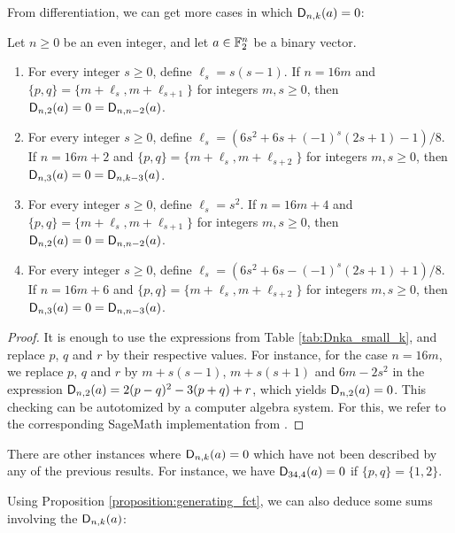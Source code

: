 \documentclass[11pt]{llncs}
\begin{document}
From differentiation, we can get more cases in which $\mathsf{D}_{n,k}(a)=0$:

\begin{proposition}
    Let $n\geq 0$ be an even integer, and let $a\in\mathbb{F}_2^n$ be a binary vector.
    \begin{enumerate}
        \item For every integer $s\geq0$, define $\ell_s=s(s-1)$. If $n=16m$ and $\{p,q\}=\{m+\ell_s,m+\ell_{s+1}\}$ for integers $m,s\geq 0$, then $\mathsf{D}_{n,2}(a)=0=\mathsf{D}_{n,n-2}(a)$.
        \item For every integer $s\geq 0$, define $\ell_s=\left(6s^2+6s+(-1)^s(2s+1)-1\right)/8$. If $n=16m+2$ and $\{p,q\}=\{m+\ell_s,m+\ell_{s+2}\}$ for integers $m,s\geq 0$, then $\mathsf{D}_{n,3}(a)=0=\mathsf{D}_{n,k-3}(a)$.
        \item For every integer $s\geq 0$, define $\ell_s=s^2$. If $n=16m+4$ and $\{p,q\}=\{m+\ell_s,m+\ell_{s+1}\}$ for integers $m,s\geq 0$, then $\mathsf{D}_{n,2}(a)=0=\mathsf{D}_{n,n-2}(a)$.
        \item For every integer $s\geq 0$, define $\ell_s=\left(6s^2+6s-(-1)^s(2s+1)+1\right)/8$. If $n=16m+6$ and $\{p,q\}=\{m+\ell_s,m+\ell_{s+2}\}$ for integers $m,s\geq 0$, then $\mathsf{D}_{n,3}(a)=0=\mathsf{D}_{n,n-3}(a)$.
    \end{enumerate}
\end{proposition}

\begin{proof}
    It is enough to use the expressions from Table \ref{tab:Dnka_small_k}, and replace $p$, $q$ and $r$ by their respective values. For instance, for the case $n=16m$, we replace $p$, $q$ and $r$ by $m+s(s-1)$, $m+s(s+1)$ and $6m-2s^2$ in the expression $\mathsf{D}_{n,2}(a)=2(p-q)^2-3(p+q)+r$, which yields $\mathsf{D}_{n,2}(a)=0$. This checking can be autotomized by a computer algebra system. For this, we refer to the corresponding \textsf{SageMath} implementation from \cite{githubseure24}.
\end{proof}

\begin{remark}
    There are other instances where $\mathsf{D}_{n,k}(a)=0$ which have not been described by any of the previous results. For instance, we have $\mathsf{D}_{34,4}(a)=0$ if $\{p,q\}=\{1,2\}$.
\end{remark}

Using Proposition \ref{proposition:generating_fct}, we can also deduce some sums involving the $\mathsf{D}_{n,k}(a)$:
\end{document}
